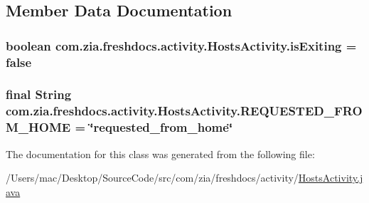 \subsection{Member Data Documentation}
\hypertarget{classcom_1_1zia_1_1freshdocs_1_1activity_1_1_hosts_activity_a245aec4556ef1ef381fc5106e1d3034e}{
\subsubsection[{is\-Exiting}]{\setlength{\rightskip}{0pt plus 5cm}boolean com.\-zia.\-freshdocs.\-activity.\-Hosts\-Activity.\-is\-Exiting = false\hspace{0.3cm}{\ttfamily [static]}}}\label{classcom_1_1zia_1_1freshdocs_1_1activity_1_1_hosts_activity_a245aec4556ef1ef381fc5106e1d3034e}
\hypertarget{classcom_1_1zia_1_1freshdocs_1_1activity_1_1_hosts_activity_a226c914fe5e983ad39ca6c182b5fc0e1}{
\subsubsection[{R\-E\-Q\-U\-E\-S\-T\-E\-D\-\_\-\-F\-R\-O\-M\-\_\-\-H\-O\-M\-E}]{\setlength{\rightskip}{0pt plus 5cm}final String com.\-zia.\-freshdocs.\-activity.\-Hosts\-Activity.\-R\-E\-Q\-U\-E\-S\-T\-E\-D\-\_\-\-F\-R\-O\-M\-\_\-\-H\-O\-M\-E = \char`\"{}requested\-\_\-from\-\_\-home\char`\"{}\hspace{0.3cm}{\ttfamily [static]}}}\label{classcom_1_1zia_1_1freshdocs_1_1activity_1_1_hosts_activity_a226c914fe5e983ad39ca6c182b5fc0e1}


The documentation for this class was generated from the following file\-:\begin{DoxyCompactItemize}
\item 
/\-Users/mac/\-Desktop/\-Source\-Code/src/com/zia/freshdocs/activity/\hyperlink{_hosts_activity_8java}{Hosts\-Activity.\-java}\end{DoxyCompactItemize}

